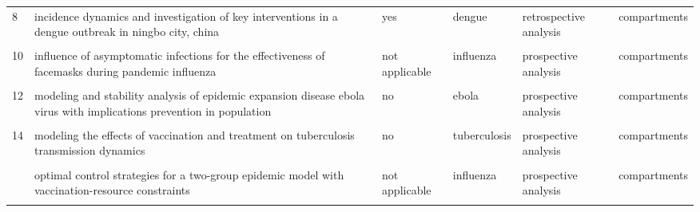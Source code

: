 \documentclass[
]{article}
\begin{document}
\begin{landscape}
\begin{longtable}{l>{\raggedright\arraybackslash}p{3.3cm}l>{\raggedright\arraybackslash}p{3.3cm}>{\raggedright\arraybackslash}p{2cm}l}
8 & incidence dynamics and investigation of key interventions in a dengue outbreak in ningbo city, china & yes & dengue & retrospective analysis & compartments\\
\cellcolor{gray!6}{9} & \cellcolor{gray!6}{incorporating media data into a model of infectious disease transmission} & \cellcolor{gray!6}{yes} & \cellcolor{gray!6}{influenza} & \cellcolor{gray!6}{retrospective analysis} & \cellcolor{gray!6}{agents}\\
10 & influence of asymptomatic infections for the effectiveness of facemasks during pandemic influenza & not applicable & influenza & prospective analysis & compartments\\
\addlinespace
\cellcolor{gray!6}{11} & \cellcolor{gray!6}{mathematical analysis of a cholera infection model with vaccination strategy} & \cellcolor{gray!6}{yes} & \cellcolor{gray!6}{cholera} & \cellcolor{gray!6}{prospective analysis} & \cellcolor{gray!6}{compartments}\\
12 & modeling and stability analysis of epidemic expansion disease ebola virus with implications prevention in population & no & ebola & prospective analysis & compartments\\
\cellcolor{gray!6}{13} & \cellcolor{gray!6}{modeling the effectiveness of respiratory protective devices in reducing influenza outbreak} & \cellcolor{gray!6}{not applicable} & \cellcolor{gray!6}{influenza} & \cellcolor{gray!6}{prospective analysis} & \cellcolor{gray!6}{compartments}\\
14 & modeling the effects of vaccination and treatment on tuberculosis transmission dynamics & no & tuberculosis & prospective analysis & compartments\\
\cellcolor{gray!6}{15} & \cellcolor{gray!6}{optimal control and cost-effective analysis of the 2017 meningitis outbreak in nigeria} & \cellcolor{gray!6}{no} & \cellcolor{gray!6}{meningococcal meningitis} & \cellcolor{gray!6}{retrospective analysis} & \cellcolor{gray!6}{compartments}\\
\addlinespace
16 & optimal control strategies for a two-group epidemic model with vaccination-resource constraints & not applicable & influenza & prospective analysis & compartments\\
\cellcolor{gray!6}{17} & \cellcolor{gray!6}{optimal media reporting intensity on mitigating spread of an emerging infectious disease} & \cellcolor{gray!6}{yes} & \cellcolor{gray!6}{influenza} & \cellcolor{gray!6}{prospective analysis} & \cellcolor{gray!6}{compartments}\\

\end{longtable}
\end{landscape}
\end{document}
